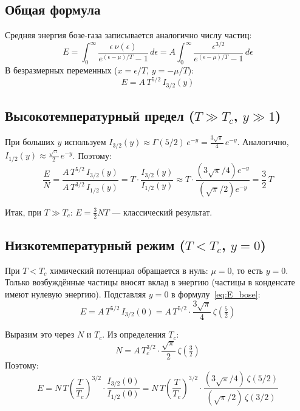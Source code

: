 \documentclass[../general/general]{subfiles}
\begin{document}
\subsection{Общая формула}

Средняя энергия бозе-газа записывается аналогично числу частиц:
\begin{equation}
    E = \int_0^\infty \frac{\epsilon\,\nu(\epsilon)}{e^{(\epsilon-\mu)/T}-1}\, d\epsilon = A\int_0^\infty \frac{\epsilon^{3/2}}{e^{(\epsilon-\mu)/T}-1}\, d\epsilon
\end{equation}
В безразмерных переменных ($x = \epsilon/T$, $y = -\mu/T$):
\begin{equation}
    E = A\,T^{5/2}\, I_{3/2}(y)
    \label{eq:E_bose}
\end{equation}

\subsection{Высокотемпературный предел ($T \gg T_c$, $y \gg 1$)}

При больших $y$ используем $I_{3/2}(y) \approx \Gamma(5/2)\,e^{-y} = \frac{3\sqrt{\pi}}{4}\,e^{-y}$. Аналогично, $I_{1/2}(y) \approx \frac{\sqrt{\pi}}{2}\,e^{-y}$. Поэтому:
\begin{equation}
    \frac{E}{N} = \frac{A\,T^{5/2}\,I_{3/2}(y)}{A\,T^{3/2}\,I_{1/2}(y)} = T\cdot\frac{I_{3/2}(y)}{I_{1/2}(y)} \approx T\cdot\frac{(3\sqrt{\pi}/4)e^{-y}}{(\sqrt{\pi}/2)e^{-y}} = \frac{3}{2}\,T
\end{equation}

Итак, при $T \gg T_c$: $E = \frac{3}{2}NT$ --- классический результат.

\subsection{Низкотемпературный режим ($T < T_c$, $y = 0$)}

При $T < T_c$ химический потенциал обращается в нуль: $\mu = 0$, то есть $y = 0$. Только возбуждённые частицы вносят вклад в энергию (частицы в конденсате имеют нулевую энергию). Подставляя $y = 0$ в формулу~\eqref{eq:E_bose}:
\begin{equation}
    E = A\,T^{5/2}\,I_{3/2}(0) = A\,T^{5/2}\cdot\frac{3\sqrt{\pi}}{4}\,\zeta\!\left(\tfrac{5}{2}\right)
\end{equation}

Выразим это через $N$ и $T_c$. Из определения $T_c$:
\begin{equation}
    N = A\,T_c^{3/2}\cdot\frac{\sqrt{\pi}}{2}\,\zeta\!\left(\tfrac{3}{2}\right)
\end{equation}
Поэтому:
\begin{equation}
    E = N\,T\left(\frac{T}{T_c}\right)^{3/2}\cdot\frac{I_{3/2}(0)}{I_{1/2}(0)} = N\,T\left(\frac{T}{T_c}\right)^{3/2}\cdot\frac{(3\sqrt{\pi}/4)\,\zeta(5/2)}{(\sqrt{\pi}/2)\,\zeta(3/2)}
\end{equation}
\end{document}

